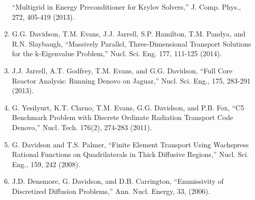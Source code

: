 \documentclass[letterpaper,11pt]{article}
\begin{document}
\begin{enumerate}
    ``Multigrid in Energy Preconditioner for Krylov Solvers,''
    J. Comp. Phys., 272, 405-419 (2013).
  \item G.G. Davidson, T.M. Evans, J.J. Jarrell, S.P. Hamilton,
    T.M. Pandya, and R.N. Slaybaugh, ``Massively Parallel,
    Three-Dimensional Transport Solutions for the k-Eigenvalue
    Problem,'' Nucl. Sci. Eng. 177, 111-125 (2014).
  \item J.J. Jarrell, A.T. Godfrey, T.M. Evans, and G.G. Davidson,
    ``Full Core Reactor Analysis: Running Denovo on Jaguar,''
    Nucl. Sci. Eng., 175, 283-291 (2013).
  \item G. Yesilyurt, K.T. Clarno, T.M. Evans, G.G. Davidson, and
    P.B. Fox, ``C5 Benchmark Problem with Discrete Ordinate Radiation
    Transport Code Denovo,'' Nucl. Tech. 176(2), 274-283 (2011).
  \item G. Davidson and T.S. Palmer, ``Finite Element Transport Using
    Wachspress Rational Functions on Quadrilaterals in Thick Diffusive
    Regions,'' Nucl. Sci. Eng., 159, 242 (2008). 
  \item J.D. Densmore, G. Davidson, and D.B. Carrington, ``Emmissivity
    of Discretized Diffusion Problems,'' Ann. Nucl. Energy, 33, (2006).
\end{enumerate}
\end{document}
